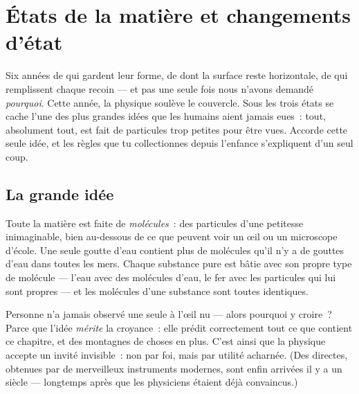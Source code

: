 \chapter{États de la matière et changements d'état}\label{ch:g7:states-of-matter}

Six années de  qui gardent leur forme, de  dont la
surface reste horizontale, de  qui remplissent chaque recoin ---
et pas une seule fois nous n'avons demandé \emph{pourquoi}. Cette
année, la physique soulève le couvercle. Sous les trois états se
cache l'une des plus grandes idées que les humains aient jamais
eues~: tout, absolument tout, est fait de particules trop petites
pour être vues. Accorde cette seule idée, et les règles que tu
collectionnes depuis l'enfance s'expliquent d'un seul coup.

\section{La grande idée}

\begin{definition}[Molécules]\label{def:g7:states-of-matter:molecule}
Toute la matière est faite de \emph{molécules}~: des
particules d'une petitesse inimaginable, bien au-dessous de ce que
peuvent voir un œil ou un microscope d'école. Une seule goutte d'eau
contient plus de molécules qu'il n'y a de gouttes d'eau dans toutes
les mers. Chaque substance pure est bâtie avec son propre type de
molécule --- l'eau avec des molécules d'eau, le fer avec les
particules qui lui sont propres --- et les molécules d'une substance
sont toutes identiques.
\end{definition}

\begin{remark}\label{rem:g7:states-of-matter:believing}
Personne n'a jamais observé une seule  à l'œil nu --- alors
pourquoi y croire~? Parce que l'idée \emph{mérite} la croyance~: elle
prédit correctement tout ce que contient ce chapitre, et des
montagnes de choses en plus. C'est ainsi que la physique accepte un
invité invisible~: non par foi, mais par utilité acharnée. (Des
 directes, obtenues par de merveilleux instruments modernes,
sont enfin arrivées il y a un siècle --- longtemps après que les
physiciens étaient déjà convaincus.)
\end{remark}

